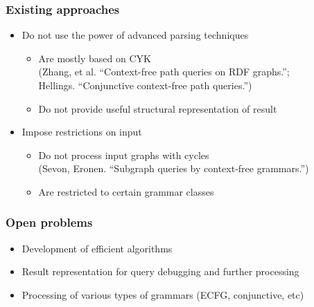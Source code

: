 \documentclass{beamer}
\begin{document}
\begin{frame}
  \transwipe[direction=90]
  \frametitle{Existing approaches}
  \begin{itemize}
    \item Do not use the power of advanced parsing techniques
    \begin{itemize}
       \item Are mostly based on CYK \\ (Zhang, et al. ``Context-free path queries on RDF graphs.''; \\ Hellings. ``Conjunctive context-free path queries.'')
       \item Do not provide useful structural representation of result
     \end{itemize}
    \item Impose restrictions on input
    \begin{itemize}
       \item Do not process input graphs with cycles \\ (Sevon, Eronen. ``Subgraph queries by context-free grammars.'')
       \item Are restricted to certain grammar classes
     \end{itemize}
  \end{itemize}
\end{frame}

\begin{frame}
  \transwipe[direction=90]
  \frametitle{Open problems}
  \begin{itemize}
    \item Development of efficient algorithms
    \item Result representation for query debugging and further processing 
    \item Processing of various types of grammars (ECFG, conjunctive, etc)
  \end{itemize}
\end{frame}

\end{document}
